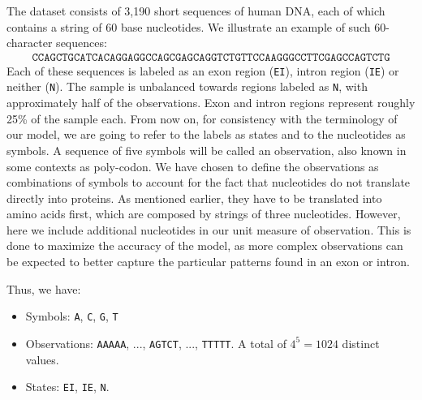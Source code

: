 \documentclass[a4paper, 11pt]{article} %
\begin{document}
The dataset consists of 3,190 short sequences of human DNA, each of which contains a string of 60 base nucleotides. We illustrate an example of such 60-character sequences:
\begin{eqnarray}
\texttt{CCAGCTGCATCACAGGAGGCCAGCGAGCAGGTCTGTTCCAAGGGCCTTCGAGCCAGTCTG}  \nonumber
\end{eqnarray}
Each of these sequences is labeled as an exon region (\texttt{EI}), intron region (\texttt{IE}) or neither (\texttt{N}). The sample is unbalanced towards regions labeled as \texttt{N}, with approximately half of the observations. Exon and intron regions represent roughly 25\% of the sample each. From now on, for consistency with the terminology of our model, we are going to refer to the labels as states and to the nucleotides as symbols. A sequence of five symbols will be called an observation, also known in some contexts as poly-codon. We have chosen to define the observations as combinations of symbols to account for the fact that nucleotides do not translate directly into proteins. As mentioned earlier, they have to be translated into amino acids first, which are composed by strings of three nucleotides. However, here we include additional nucleotides in our unit measure of observation. This is done to maximize the accuracy of the model, as more complex observations can be expected to better capture the particular patterns found in an exon or intron.

Thus, we have:
\begin{itemize}
\item Symbols: \texttt{A}, \texttt{C}, \texttt{G}, \texttt{T}
\item Observations: \texttt{AAAAA}, ..., \texttt{AGTCT}, ..., \texttt{TTTTT}. A total of $4^5=1024$ distinct values.
\item States: \texttt{EI}, \texttt{IE}, \texttt{N}.
\end{itemize}
\end{document}
